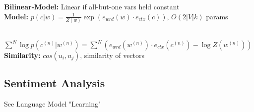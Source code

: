 \textbf{Bilinear-Model:} Linear if all-but-one vars held constant\\

\textbf{Model:} $p(c|w) = \frac{1}{Z(w)} \exp(e_{wrd}(w) \cdot e_{ctx}(c))$, $O(2|V|k)$ params\\
\\
\begin{comment}
	Every word can show up in the context and as word\\
\end{comment} 

$\sum^N \log p(c^{(n)} | w^{(n)}) = \sum^N (e_{wrd}(w^{(n)}) \cdot e_{ctx}(c^{(n)}) - \log Z(w^{(n)}))$\\

\textbf{Similarity:} $cos(u_i, u_j)$, similarity of vectors


\subsection{Sentiment Analysis}
See Language Model "Learning"




